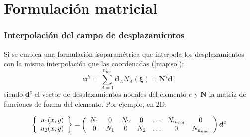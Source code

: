 \documentclass[10pt, aspectratio=43]{beamer}
\begin{document}
\section[Matricial]{Formulación matricial}
\begin{frame}
\frametitle{Interpolación del campo de desplazamientos}

Si se emplea una formulación isoparamétrica que interpola los
desplazamientos con la misma interpolación que las coordenadas
(\ref{mapiso}):
\begin{equation}
\bm{u}^h=\sum_{A=1}^{n^e_{\textrm{nod}}}
\bm{d}_{A} N_{A}(\bm{\xi}) = \mathbf{N}^{T} \bm{d}^e \label{disiso}
\end{equation}
siendo $\bm{d}^e$ el vector de desplazamientos nodales del elemento $e$
y $\mathbf{N}$ la matriz de funciones de forma del elemento. Por ejemplo, en
$2$D:
\begin{small}
\begin{equation}
\left\{
\begin{array}{c}
u_1(x,y) \\
u_2(x,y) 
\end{array}
\right\}=
\left(
\begin{array}{ccccccc}
N_1 &  0  & N_2 &  0  & \ldots & N_{\textrm n_{nod}} & 0                    \\
0   & N_1 &  0  & N_2 & \ldots &           0          & N_{\textrm n_{nod}}
\end{array}
\right) \bm{d}^e
\label{indisge}
\end{equation}
\end{small}
\end{frame}
\end{document}
